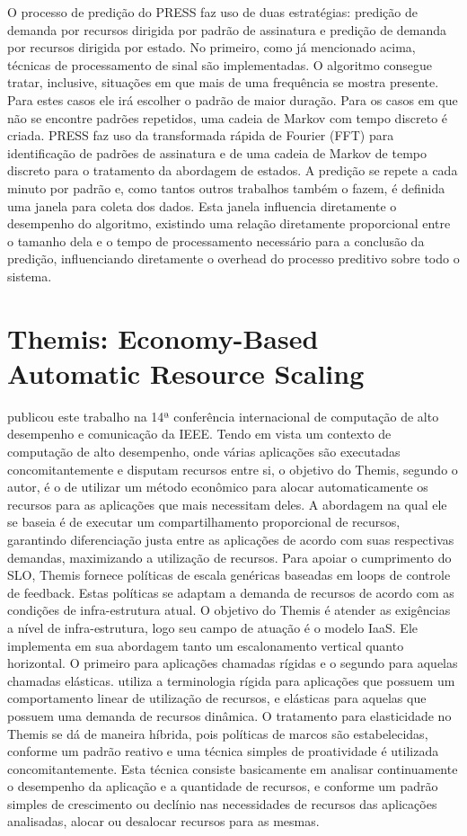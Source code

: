 \documentclass[twoside,english,brazilian]{UNISINOSmonografia}
\begin{document}
O processo de predição do PRESS faz uso de duas estratégias: predição de demanda por recursos dirigida por padrão de assinatura e predição de demanda por recursos dirigida por estado. No primeiro, como já mencionado acima, técnicas de processamento de sinal são implementadas. O algoritmo consegue tratar, inclusive, situações em que mais de uma frequência se mostra presente. Para estes casos ele irá escolher o padrão de maior duração. Para os casos em que não se encontre padrões repetidos, uma cadeia de Markov com tempo discreto é criada. PRESS faz uso da transformada rápida de Fourier (FFT) para identificação de padrões de assinatura e de uma cadeia de Markov de tempo discreto para o tratamento da abordagem de estados. A predição se repete a cada minuto por padrão e, como tantos outros trabalhos também o fazem, é definida uma janela para coleta dos dados. Esta janela influencia diretamente o desempenho do algoritmo, existindo uma relação diretamente proporcional entre o tamanho dela e o tempo de processamento necessário para a conclusão da predição, influenciando diretamente o overhead do processo preditivo sobre todo o sistema. 


\section{Themis: Economy-Based Automatic Resource Scaling}
\cite{Costache2012} publicou este trabalho na 14ª conferência internacional de computação de alto desempenho e comunicação da IEEE. Tendo em vista um contexto de computação de alto desempenho, onde várias aplicações são executadas concomitantemente e disputam recursos entre si, o objetivo do Themis, segundo o autor, é o de utilizar um método econômico para alocar automaticamente os recursos para as aplicações que mais necessitam deles. A abordagem na qual ele se baseia é de executar um compartilhamento proporcional de recursos, garantindo diferenciação justa entre as aplicações de acordo com suas respectivas demandas, maximizando a utilização de recursos. Para apoiar o cumprimento do SLO, Themis fornece políticas de escala genéricas baseadas em loops de controle de feedback. Estas políticas se adaptam a demanda de recursos de acordo com as condições de infra-estrutura atual. O objetivo do Themis é atender as exigências a nível de infra-estrutura, logo seu campo de atuação é o modelo IaaS. Ele implementa em sua abordagem tanto um escalonamento vertical quanto horizontal. O primeiro para aplicações chamadas rígidas e o segundo para aquelas chamadas elásticas. \citep{Costache2012} utiliza a terminologia rígida para aplicações que possuem um comportamento linear de utilização de recursos, e elásticas para aquelas que possuem uma demanda de recursos dinâmica. O tratamento para elasticidade no Themis se dá de maneira híbrida, pois políticas de marcos são estabelecidas, conforme um padrão reativo e uma técnica simples de proatividade é utilizada concomitantemente. Esta técnica consiste basicamente em analisar continuamente o desempenho da aplicação e a quantidade de recursos, e conforme um padrão simples de crescimento ou declínio nas necessidades de recursos das aplicações analisadas, alocar ou desalocar recursos para as mesmas. 
\end{document}
